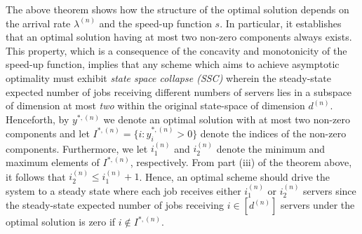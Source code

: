 \documentclass[a4paper]{article}
\theoremstyle{plain}
\newtheorem{remark}{Remark}
\theoremstyle{definition}
\theoremstyle{case}
\theoremstyle{remark}
\newcommand{\abs}[1]{\lvert #1 \rvert}
\begin{document}
The above theorem shows how the structure of the optimal solution depends on the arrival rate $\lambda^{(n)}$ and the speed-up function $s$. 
In particular, it establishes that an optimal solution having at most two non-zero components always exists. 
This property, which is a consequence of the concavity and monotonicity of the speed-up function, implies that any scheme which aims to achieve asymptotic optimality must exhibit {\em state space collapse (SSC)} wherein the steady-state expected number of jobs receiving different numbers of servers lies in a subspace of dimension at most {\em two} within the original state-space of dimension $d^{(n)}$.
Henceforth, by $y^{*,(n)}$ we denote an optimal solution with at most two non-zero components and let $I^{*,(n)}=\{i: y^{*,{(n)}}_i > 0\}$ denote the indices of the non-zero components. 
Furthermore, we let $i_1^{(n)}$ and $i_2^{(n)}$ denote the minimum and maximum elements of $I^{*,(n)}$, respectively. From part (iii) of the theorem above, it follows that  $i_2^{(n)}\leq i_1^{(n)}+1$. Hence, an optimal scheme should drive the system to a steady state where each job receives either $i_1^{(n)}$ or $i_2^{(n)}$ servers since the steady-state expected number of jobs receiving $i \in [d^{(n)}]$ servers under the optimal solution is zero if $i\notin I^{*,{(n)}}$.

\end{document}
